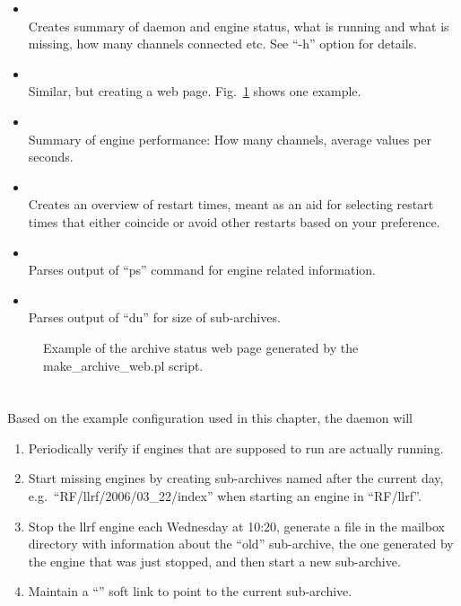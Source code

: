 \begin{itemize}
\item {} \\
      Creates summary of daemon and engine status,
      what is running and what is missing,
      how many channels connected etc.
      See ``-h'' option for details.
\item {} \\
      Similar, but creating a web page. Fig.~\ref{fig:archcfgstat}
      shows one example.
\item {} \\
      Summary of engine performance: How many channels, average values
      per seconds.
\item {} \\
      Creates an overview of restart times, meant as an aid for selecting
      restart times that either coincide or avoid other restarts based
      on your preference. 
\item {} \\
      Parses output of ``ps'' command for engine related information.
\item {} \\
      Parses output of ``du'' for size of sub-archives.
\end{itemize}

\begin{figure}[htb]
\begin{center}
\end{center}
\caption{\label{fig:archcfgstat}Example of the archive status web page
  generated by the make\_archive\_web.pl script.}
\end{figure}

\section{}
Based on the example configuration used in this chapter,
the daemon will 
\begin{enumerate}
\item Periodically verify if engines that are supposed to run are
      actually running.
\item Start missing engines by creating sub-archives named
      after the current day,
      e.g.\ ``RF/llrf/2006/03\_22/index''
      when starting an engine in ``RF/llrf''.
\item Stop the llrf engine each Wednesday at 10:20,
      generate a file in the mailbox directory with information about
      the ``old'' sub-archive, the one generated by the engine that was
      just stopped,
      and then start a new sub-archive.
\item Maintain a ``'' soft link to point to the current
      sub-archive.
\end{enumerate}

